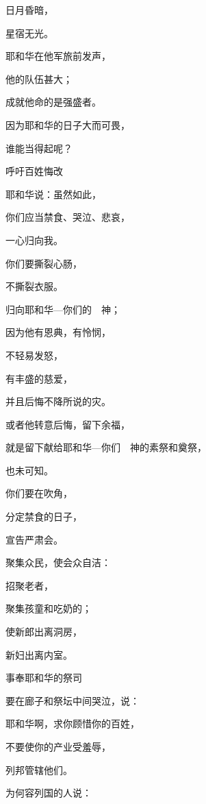 {\par }{\Q 日月昏暗，
\par }{\Q 星宿无光。
\par }{\Q {}耶和华在他军旅前发声，
\par }{\Q 他的队伍甚大；
\par }{\Q 成就他命的是强盛者。
\par }{\Q 因为耶和华的日子大而可畏，
\par }{\Q 谁能当得起呢？
\par }{\BB \par }{\SH 呼吁百姓悔改
\par }{\Q {}耶和华说：虽然如此，
\par }{\Q 你们应当禁食、哭泣、悲哀，
\par }{\Q 一心归向我。
\par }{\Q {}你们要撕裂心肠，
\par }{\Q 不撕裂衣服。
\par }{\Q 归向耶和华—你们的　神；
\par }{\Q 因为他有恩典，有怜悯，
\par }{\Q 不轻易发怒，
\par }{\Q 有丰盛的慈爱，
\par }{\Q 并且后悔不降所说的灾。
\par }{\Q {}或者他转意后悔，留下余福，
\par }{\Q 就是留下献给耶和华—你们　神的素祭和奠祭，
\par }{\Q 也未可知。
\par }{\BB \par }{\Q {}你们要在{}吹角，
\par }{\Q 分定禁食的日子，
\par }{\Q 宣告严肃会。
\par }{\Q {}聚集众民，使会众自洁：
\par }{\Q 招聚老者，
\par }{\Q 聚集孩童和吃奶的；
\par }{\Q 使新郎出离洞房，
\par }{\Q 新妇出离内室。
\par }{\BB \par }{\Q {}事奉耶和华的祭司
\par }{\Q 要在廊子和祭坛中间哭泣，说：
\par }{\Q 耶和华啊，求你顾惜你的百姓，
\par }{\Q 不要使你的产业受羞辱，
\par }{\Q 列邦管辖他们。
\par }{\Q 为何容列国的人说：
}
